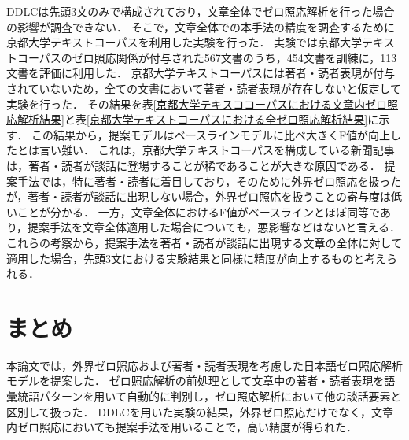 \documentclass[japanese]{jnlp_1.4}
\begin{document}
DDLCは先頭3文のみで構成されており，文章全体でゼロ照応解析を行った場合の影響が調査できない．
そこで，文章全体での本手法の精度を調査するために京都大学テキストコーパスを利用した実験を行った．
実験では京都大学テキストコーパスのゼロ照応関係が付与された567文書のうち，454文書を訓練に，113文書を評価に利用した．
京都大学テキストコーパスには著者・読者表現が付与されていないため，全ての文書において著者・読者表現が存在しないと仮定して実験を行った．
その結果を表\ref{京都大学テキスココーパスにおける文章内ゼロ照応解析結果}と表\ref{京都大学テキストコーパスにおける全ゼロ照応解析結果}に示す．
この結果から，提案モデルはベースラインモデルに比べ大きくF値が向上したとは言い難い．
これは，京都大学テキストコーパスを構成している新聞記事は，著者・読者が談話に登場することが稀であることが大きな原因である．
提案手法では，特に著者・読者に着目しており，そのために外界ゼロ照応を扱ったが，著者・読者が談話に出現しない場合，外界ゼロ照応を扱うことの寄与度は低いことが分かる．
\linebreak
一方，文章全体におけるF値がベースラインとほぼ同等であり，提案手法を文章全体適用した場合についても，悪影響などはないと言える．
これらの考察から，提案手法を著者・読者が談話に出現する文章の全体に対して適用した場合，先頭3文における実験結果と同様に精度が向上するものと考えられる．
\vspace{-0.3\Cvs}

\begin{table}[t]
\setlength{\captionwidth}{200pt}
\begin{minipage}{200pt}
\label{京都大学テキスココーパスにおける文章内ゼロ照応解析結果}

\end{minipage}
\hfill
\begin{minipage}{200pt}
\label{京都大学テキストコーパスにおける全ゼロ照応解析結果}

\end{minipage}
\end{table}


\section{まとめ}
\label{115208_18Jun13}
\vspace{-0.2\Cvs}

本論文では，外界ゼロ照応および著者・読者表現を考慮した日本語ゼロ照応解析モデルを提案した．
ゼロ照応解析の前処理として文章中の著者・読者表現を語彙統語パターンを用いて自動的に判別し，ゼロ照応解析において他の談話要素と区別して扱った．
DDLCを用いた実験の結果，外界ゼロ照応だけでなく，文章内ゼロ照応においても提案手法を用いることで，高い精度が得られた．
\end{document}
